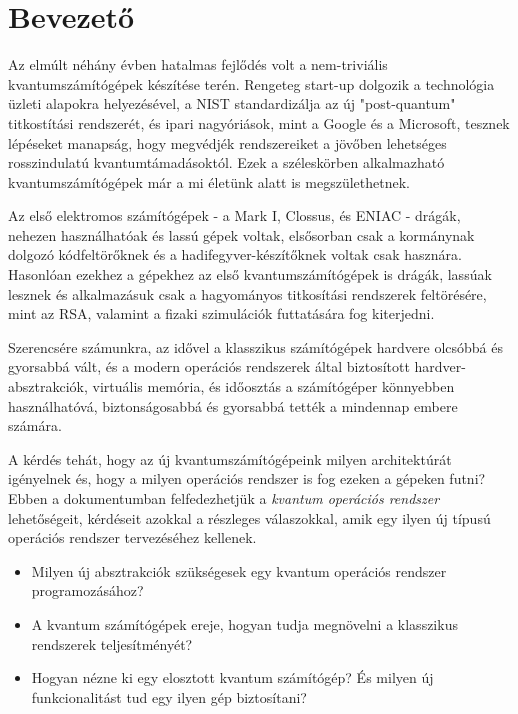 \chapter*{Bevezető}

\hspace{2mm} Az elmúlt néhány évben hatalmas fejlődés volt a nem-triviális kvantumszámítógépek készítése terén.
Rengeteg start-up dolgozik a technológia üzleti alapokra helyezésével, a NIST standardizálja az új "post-quantum" titkostítási rendszerét, és ipari nagyóriások, mint a Google és a Microsoft, tesznek lépéseket manapság, hogy megvédjék rendszereiket a jövőben lehetséges rosszindulatú kvantumtámadásoktól.
Ezek a széleskörben alkalmazható kvantumszámítógépek már a mi életünk alatt is megszülethetnek.

\indent Az első elektromos számítógépek - a Mark I, Clossus, és ENIAC - drágák, nehezen használhatóak és lassú gépek voltak, elsősorban csak a kormánynak dolgozó kódfeltörőknek és a hadifegyver-készítőknek voltak csak hasznára.
Hasonlóan ezekhez a gépekhez az első kvantumszámítógépek is drágák, lassúak lesznek és alkalmazásuk csak a hagyományos titkosítási rendszerek feltörésére, mint az RSA, valamint a fizaki szimulációk futtatására fog kiterjedni.

\indent Szerencsére számunkra, az idővel a klasszikus számítógépek hardvere olcsóbbá és gyorsabbá vált, és a modern operációs rendszerek által biztosított hardver-absztrakciók, virtuális memória, és időosztás  a számítógéper könnyebben használhatóvá, biztonságosabbá és gyorsabbá tették a mindennap embere számára.

\indent A kérdés tehát, hogy az új kvantumszámítógépeink milyen architektúrát igényelnek és, hogy a milyen operációs rendszer is fog ezeken a gépeken futni?
Ebben a dokumentumban felfedezhetjük a \textit{kvantum operációs rendszer} lehetőségeit, kérdéseit azokkal a részleges válaszokkal, amik egy ilyen új típusú operációs rendszer tervezéséhez kellenek.
\begin{itemize}
\item Milyen új absztrakciók szükségesek egy kvantum operációs rendszer programozásához?
\item A kvantum számítógépek ereje, hogyan tudja megnövelni a klasszikus rendszerek teljesítményét?
\item Hogyan nézne ki egy elosztott kvantum számítógép? És milyen új funkcionalitást tud egy ilyen gép biztosítani?
\end{itemize}

